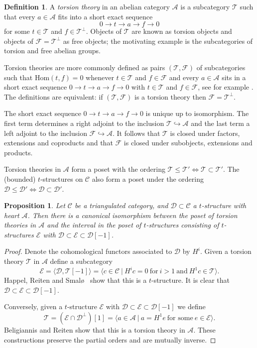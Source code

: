 \documentclass{article}
\theoremstyle{plain}
\newtheorem{proposition}[theorem]{Proposition}
\theoremstyle{definition}
\newtheorem{definition}[theorem]{Definition}
\theoremstyle{remark}
\newcommand{\defn}[1]{\emph{#1}}
\newcommand{\cat}[1]{\mathcal{#1}}
\newcommand{\mor}[2]{{\mathrm{Hom}}(#1,#2)}
\begin{document}
\begin{definition}
A \defn{torsion theory} in an abelian category $\cat{A}$ is a subcategory $\cat{T}$ such that every $a\in \cat{A}$ fits into a short exact sequence
$$
0 \to t \to a \to f \to 0
$$
for some $t\in \cat{T}$ and $f\in \cat{T}^\perp$.  Objects of $\cat{T}$ are known as torsion objects and objects of $\cat{F}=\cat{T}^\perp$ as free objects; the motivating example is the subcategories of torsion and free abelian groups. 
\end{definition}
Torsion theories are more commonly defined as pairs $(\cat{T},\cat{F})$ of subcategories such that $\mor{t}{f}=0$ whenever $t\in \cat{T}$ and $f\in \cat{F}$ and every $a\in \cat{A}$ sits in a short exact sequence $0\to t \to a \to f \to 0$ with $t\in \cat{T}$ and $f\in \cat{F}$, see for example \cite[Definition 1.1]{MR2327478}. The definitions are equivalent: if $(\cat{T}, \cat{F})$ is a torsion theory then $\cat{F}= \cat{T}^\perp$. 
 

  
  The short exact sequence $0\to t\to a \to f \to 0$ is unique up to isomorphism. The first term determines a right adjoint to the inclusion $\cat{T} \hookrightarrow \cat{A}$ and the last term a left adjoint to the inclusion $\cat{F} \hookrightarrow \cat{A}$. It follows that $\cat{T}$ is closed under factors, extensions and coproducts and that $\cat{F}$ is closed under subobjects, extensions and products. 

Torsion theories in $\cat{A}$ form a poset with the ordering $\cat{T} \leq \cat{T}' \iff \cat{T} \subset \cat{T}'$. The (bounded) $t$-structures on $\cat{C}$ also form a poset under the ordering $\cat{D} \leq \cat{D}' \iff \cat{D} \subset \cat{D}'$. 
\begin{proposition}
\label{HRS}
Let $\cat{C}$ be a triangulated category, and $\cat{D} \subset \cat{C}$ a $t$-structure with heart $\cat{A}$.  Then there is a canonical isomorphism between the poset of torsion theories in $\cat{A}$ and the interval in the poset of $t$-structures consisting of $t$-structures $\cat{E}$ with $\cat{D} \subset \cat{E} \subset \cat{D}[-1]$. 
\end{proposition}
\begin{proof}
Denote the cohomological functors associated to $\cat{D}$ by $H^i$. Given a torsion theory $\cat{T}$ in $\cat{A}$ define a subcategory
$$
\cat{E} = \langle \cat{D}, \cat{T}[-1] \rangle = \langle c \in \cat{C}\ |\ H^ic=0 \ \textrm{for}\  i>1 \ \textrm{and}\ H^1c \in \cat{T}\rangle.
$$
Happel, Reiten and Smal\o\ \cite[Proposition 2.1]{Happel:1996uq} show that this is a $t$-structure. It is clear that $\cat{D} \subset \cat{E} \subset \cat{D}[-1]$. 

Conversely, given a $t$-structure $\cat{E}$ with $\cat{D}\subset \cat{E} \subset \cat{D}[-1]$ we define $$\cat{T}=(\cat{E} \cap \cat{D}^\perp)[1] = \langle a\in\cat{A}\ |\ a=H^1e \ \textrm{for some} \ e\in \cat{E} \rangle.$$ 
Beligiannis and Reiten \cite[Theorem 3.1]{MR2327478} show that this is a torsion theory in $\cat{A}$. These constructions preserve the partial orders and are mutually inverse. 
\end{proof}
\end{document}
